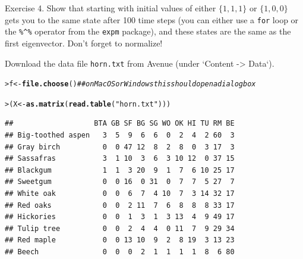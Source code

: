 \documentclass[11pt]{article}\usepackage[]{graphicx}\usepackage[]{color}
\makeatletter
\newcommand{\hlstr}[1]{\textcolor[rgb]{0.192,0.494,0.8}{#1}}%
\newcommand{\hlcom}[1]{\textcolor[rgb]{0.678,0.584,0.686}{\textit{#1}}}%
\newcommand{\hlstd}[1]{\textcolor[rgb]{0.345,0.345,0.345}{#1}}%
\newcommand{\hlkwb}[1]{\textcolor[rgb]{0.69,0.353,0.396}{#1}}%
\newcommand{\hlkwd}[1]{\textcolor[rgb]{0.737,0.353,0.396}{\textbf{#1}}}%
\newenvironment{kframe}{%
 \def\at@end@of@kframe{}%
 \ifinner\ifhmode%
  \def\at@end@of@kframe{\end{minipage}}%
  \begin{minipage}{\columnwidth}%
 \fi\fi%
 \def\FrameCommand##1{\hskip\@totalleftmargin \hskip-\fboxsep
 \colorbox{shadecolor}{##1}\hskip-\fboxsep
     \hskip-\linewidth \hskip-\@totalleftmargin \hskip\columnwidth}%
 \MakeFramed {\advance\hsize-\width
   \@totalleftmargin\z@ \linewidth\hsize
   \@setminipage}}%
 {\par\unskip\endMakeFramed%
 \at@end@of@kframe}
\newenvironment{knitrout}{}{} %
\newcommand{\code}[1]{{\tt #1}}
\numberwithin{exercise}{section}
\makeatother
\begin{document}



Exercise 4. Show that starting with initial values of either
$\{1,1,1\}$ or $\{1,0,0\}$ gets you to the same state after 100 time
steps (you can either use a \code{for} loop or the \verb+%^%+ operator
from the \code{expm} package), and these states are the same as the
first eigenvector.  Don't forget to normalize!








Download the data file \code{horn.txt} from Avenue (under `Content ->
Data`).

\begin{knitrout}
\color{fgcolor}\begin{kframe}
\begin{alltt}
\hlstd{> }\hlstd{f} \hlkwb{<-} \hlkwd{file.choose}\hlstd{()}  \hlcom{## on MacOS or Windows this should open a dialog box}
\end{alltt}
\end{kframe}
\end{knitrout}

\begin{knitrout}
\color{fgcolor}\begin{kframe}
\begin{alltt}
\hlstd{> }\hlstd{(X} \hlkwb{<-} \hlkwd{as.matrix}\hlstd{(}\hlkwd{read.table}\hlstd{(}\hlstr{"horn.txt"}\hlstd{)))}
\end{alltt}
\begin{verbatim}
##                   BTA GB SF BG SG WO OK HI TU RM BE
## Big-toothed aspen   3  5  9  6  6  0  2  4  2 60  3
## Gray birch          0  0 47 12  8  2  8  0  3 17  3
## Sassafras           3  1 10  3  6  3 10 12  0 37 15
## Blackgum            1  1  3 20  9  1  7  6 10 25 17
## Sweetgum            0  0 16  0 31  0  7  7  5 27  7
## White oak           0  0  6  7  4 10  7  3 14 32 17
## Red oaks            0  0  2 11  7  6  8  8  8 33 17
## Hickories           0  0  1  3  1  3 13  4  9 49 17
## Tulip tree          0  0  2  4  4  0 11  7  9 29 34
## Red maple           0  0 13 10  9  2  8 19  3 13 23
## Beech               0  0  0  2  1  1  1  1  8  6 80
\end{verbatim}
\end{kframe}
\end{knitrout}
\end{document}
